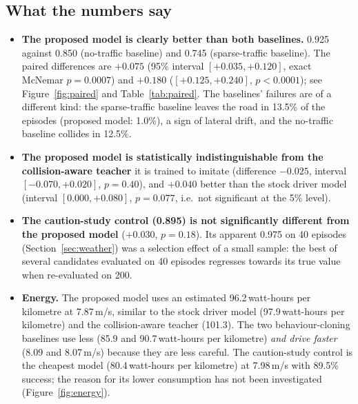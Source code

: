 \subsection{What the numbers say}
\begin{itemize}
\item \textbf{The proposed model is clearly better than both baselines.} 0.925 against 0.850 (no-traffic baseline) and 0.745 (sparse-traffic baseline). The paired differences are $+0.075$ (95\% interval $[+0.035,+0.120]$, exact McNemar $p=0.0007$) and $+0.180$ ($[+0.125,+0.240]$, $p<0.0001$); see Figure~\ref{fig:paired} and Table~\ref{tab:paired}.
  The baselines' failures are of a different kind: the sparse-traffic baseline leaves the road in 13.5\% of the episodes (proposed model: 1.0\%), a sign of lateral drift, and the no-traffic baseline collides in 12.5\%.
\item \textbf{The proposed model is statistically indistinguishable from the collision-aware teacher} it is trained to imitate (difference $-0.025$, interval $[-0.070,+0.020]$, $p=0.40$), and $+0.040$ better than the stock driver model (interval $[0.000,+0.080]$, $p=0.077$, i.e.\ not significant at the 5\% level).
\item \textbf{The caution-study control (0.895) is not significantly different from the proposed model} ($+0.030$, $p=0.18$). Its apparent 0.975 on 40 episodes (Section~\ref{sec:weather}) was a selection effect of a small sample: the best of several candidates evaluated on 40 episodes regresses towards its true value when re-evaluated on 200.
\item \textbf{Energy.} The proposed model uses an estimated 96.2\,watt-hours per kilometre at 7.87\,m/s, similar to the stock driver model (97.9\,watt-hours per kilometre) and the collision-aware teacher (101.3). The two behaviour-cloning baselines use less (85.9 and 90.7\,watt-hours per kilometre) \emph{and drive faster} (8.09 and 8.07\,m/s) because they are less careful. The caution-study control is the cheapest model (80.4\,watt-hours per kilometre) at 7.98\,m/s with 89.5\% success;
  the reason for its lower consumption has not been investigated (Figure~\ref{fig:energy}).
\end{itemize}





\begin{table}[H]\centering\small
\caption{Paired comparison of the proposed model with each other model. ``Only proposed model'' counts the seeds on which the proposed model succeeded and the other model did not; the exact McNemar test uses only these discordant seeds.}\label{tab:paired}
\resizebox{\textwidth}{!}{}
\end{table}


